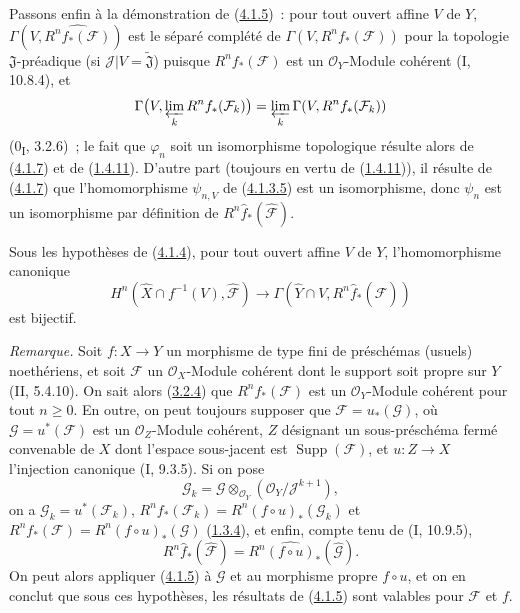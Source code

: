 \begin{env}[4.1.8]
\label{III.4.1.8-fr}
Passons enfin à la démonstration de (\hyperref[III.4.1.5-fr]{4.1.5})~:
pour tout ouvert affine $V$ de $Y$,
$\Gamma(V,\widehat{R^nf_*(\mathcal F)})$ est le séparé complété de
$\Gamma(V,R^nf_*(\mathcal F))$ pour la topologie $\mathfrak J$-préadique
(si $\mathcal J|V=\widetilde{\mathfrak J}$) puisque
$R^nf_*(\mathcal F)$ est un $\mathcal O_Y$-Module cohérent (I, 10.8.4),
et
\[
\Gamma\bigl(V,\varprojlim_kR^nf_*(\mathcal F_k)\bigr)
=\varprojlim_k\Gamma(V,R^nf_*(\mathcal F_k))
\]
(0\textsubscript{I}, 3.2.6)~; le fait que $\varphi_n$ soit un isomorphisme
topologique résulte alors de (\hyperref[III.4.1.7-fr]{4.1.7}) et de
(\hyperref[III.1.4.11-fr]{1.4.11}). D'autre part (toujours en vertu de
(\hyperref[III.1.4.11-fr]{1.4.11})), il résulte de
(\hyperref[III.4.1.7-fr]{4.1.7}) que l'homomorphisme $\psi_{n,V}$ de
(\hyperref[III.4.1.3.5-fr]{4.1.3.5}) est un isomorphisme, donc $\psi_n$
est un isomorphisme par définition de
$R^n\widehat f_*(\widehat{\mathcal F})$.
\end{env}

\begin{corollary}[4.1.9]
\label{III.4.1.9-fr}
Sous les hypothèses de (\hyperref[III.4.1.4-fr]{4.1.4}), pour tout ouvert
affine $V$ de $Y$, l'homomorphisme canonique
\[
H^n(\widehat X\cap f^{-1}(V),\widehat{\mathcal F})
\longrightarrow\Gamma(\widehat Y\cap V,
R^n\widehat f_*(\widehat{\mathcal F}))
\]
est bijectif.
\end{corollary}

\begin{env}[4.1.10]
\label{III.4.1.10-fr}
\emph{Remarque.}
Soit $f:X\to Y$ un morphisme de type fini de préschémas (usuels)
noethériens, et soit $\mathcal F$ un $\mathcal O_X$-Module cohérent dont le
support soit propre sur $Y$ (II, 5.4.10). On sait alors
(\hyperref[III.3.2.4-fr]{3.2.4}) que $R^nf_*(\mathcal F)$ est un
$\mathcal O_Y$-Module cohérent pour tout $n\geq0$. En outre, on peut
toujours supposer que $\mathcal F=u_*(\mathcal G)$, où
$\mathcal G=u^*(\mathcal F)$ est un $\mathcal O_Z$-Module cohérent, $Z$
désignant un sous-préschéma fermé convenable de $X$ dont l'espace
sous-jacent est $\operatorname{Supp}(\mathcal F)$, et $u:Z\to X$
l'injection canonique (I, 9.3.5). Si on pose
\[
\mathcal G_k=\mathcal G\otimes_{\mathcal O_Y}
(\mathcal O_Y/\mathcal J^{k+1}),
\]
on a $\mathcal G_k=u^*(\mathcal F_k)$,
$R^nf_*(\mathcal F_k)=R^n(f\circ u)_*(\mathcal G_k)$ et
$R^nf_*(\mathcal F)=R^n(f\circ u)_*(\mathcal G)$
(\hyperref[III.1.3.4-fr]{1.3.4}), et enfin, compte tenu de (I, 10.9.5),
\[
R^n\widehat f_*(\widehat{\mathcal F})
=R^n\widehat{(f\circ u)}_*(\widehat{\mathcal G}).
\]
On peut alors appliquer (\hyperref[III.4.1.5-fr]{4.1.5}) à $\mathcal G$ et
au morphisme propre $f\circ u$, et on en conclut que sous ces hypothèses,
les résultats de (\hyperref[III.4.1.5-fr]{4.1.5}) sont valables pour
$\mathcal F$ et $f$.
\end{env}

